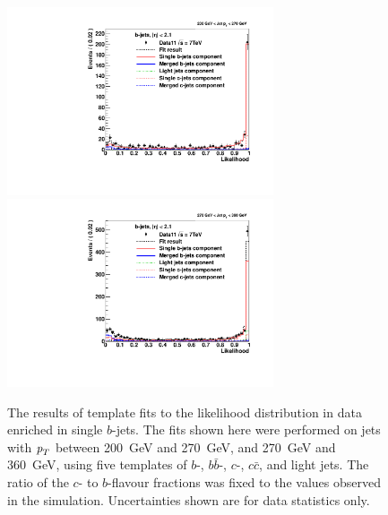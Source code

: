 \begin{figure}[tp]
\centering
\includegraphics[width=0.7\textwidth]{FIGS/Fits/LikelihoodFit_3param_ETAFull_DataEnriched2btag_Bin5.pdf}
\includegraphics[width=0.7\textwidth]{FIGS/Fits/LikelihoodFit_3param_ETAFull_DataEnriched2btag_Bin6.pdf}
\caption{The results of template fits to the likelihood distribution in data enriched in single $b$-jets. The fits shown here were performed on jets with ${\emph{p}_{T}}$ between  200~GeV and 270~GeV, and 270~GeV and 360~GeV, using five templates of $b$-, $b\bar{b}$-, $c$-, $c\bar{c}$, and light jets.  The ratio of the $c$- to $b$-flavour fractions was fixed to the values observed in the simulation.  Uncertainties shown are for data statistics only.}
\label{fig:fitenriched2btag2}
\end{figure}




